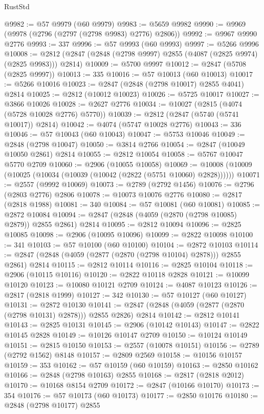 \begin{lexlean}{RustStd}
\begin{coremodule}
@9982 := @57 @9979 (@60 @9979)
@9983 := @5659 @9982
@9990 := @9969 (@9978 (@2796 (@2797 (@2798 @9983) @2776) @2806))
@9992 := @9967 @9990 @2776
@9993 := 337
@9996 := @57 @9993 (@60 @9993)
@9997 := @5266 @9996
@10008 := @2812 (@2847 (@2848 (@2798 @9997) @2855 (@4087 (@2825 @9974) (@2825 @9983))) @2814)
@10009 := @5700 @9997
@10012 := @2847 (@5708 (@2825 @9997))
@10013 := 335
@10016 := @57 @10013 (@60 @10013)
@10017 := @5266 @10016
@10023 := @2847 (@2848 (@2798 @10017) @2855 @4041) @2814
@10025 := @2812 (@10012 @10023)
@10026 := @5725 @10017
@10027 := @3866 @10026
@10028 := @2627 @2776
@10034 := @10027 (@2815 (@4074 (@5728 @10028 @2776) @5770))
@10039 := @2812 (@2847 (@5740 (@5741 @10017)) @2814)
@10042 := @4074 (@5747 @10028 @2776)
@10043 := 336
@10046 := @57 @10043 (@60 @10043)
@10047 := @5753 @10046
@10049 := @2848 (@2798 @10047)
@10050 := @3814 @2766
@10054 := @2847 (@10049 @10050 @2861) @2814
@10055 := @2812 @10054
@10058 := @5767 @10047 @5770 @2709
@10060 := @2906 (@10055 @10058)
@10069 := @10008 (@10009 (@10025 (@10034 (@10039 (@10042 (@2822 (@5751 @10060) @2828))))))
@10071 := @2557 (@9992 @10069)
@10073 := @2789 (@2792 @1456)
@10076 := @2796 (@2803 @2776) @2806
@10078 := @10073 @10076 @2776
@10080 := @2817 (@2818 @1988)
@10081 := 340
@10084 := @57 @10081 (@60 @10081)
@10085 := @2872 @10084
@10094 := @2847 (@2848 (@4059 (@2870 (@2798 @10085) @2879)) @2855 @2861) @2814
@10095 := @2812 @10094
@10096 := @2825 @10085
@10098 := @2906 (@10095 @10096)
@10099 := @2822 @10098
@10100 := 341
@10103 := @57 @10100 (@60 @10100)
@10104 := @2872 @10103
@10114 := @2847 (@2848 (@4059 (@2877 (@2870 (@2798 @10104) @2878))) @2855 @2861) @2814
@10115 := @2812 @10114
@10116 := @2825 @10104
@10118 := @2906 (@10115 @10116)
@10120 := @2822 @10118 @2828
@10121 := @10099 @10120
@10123 := @10080 @10121 @2709
@10124 := @4087 @10123
@10126 := @2817 (@2818 @1999)
@10127 := 342
@10130 := @57 @10127 (@60 @10127)
@10131 := @2872 @10130
@10141 := @2847 (@2848 (@4059 (@2877 (@2870 (@2798 @10131) @2878))) @2855 @2826) @2814
@10142 := @2812 @10141
@10143 := @2825 @10131
@10145 := @2906 (@10142 @10143)
@10147 := @2822 @10145 @2828
@10149 := @10126 @10147 @2709
@10150 := @10124 @10149
@10151 := @2815 @10150
@10153 := @2557 (@10078 @10151)
@10156 := @2789 (@2792 @1562) @8148
@10157 := @2809 @2569
@10158 := @10156 @10157
@10159 := 353
@10162 := @57 @10159 (@60 @10159)
@10163 := @2850 @10162
@10166 := @2848 (@2798 @10163) @2855
@10168 := @2817 (@2818 @2012)
@10170 := @10168 @8154 @2709
@10172 := @2847 (@10166 @10170)
@10173 := 354
@10176 := @57 @10173 (@60 @10173)
@10177 := @2850 @10176
@10180 := @2848 (@2798 @10177) @2855

\end{coremodule}
\end{lexlean}

